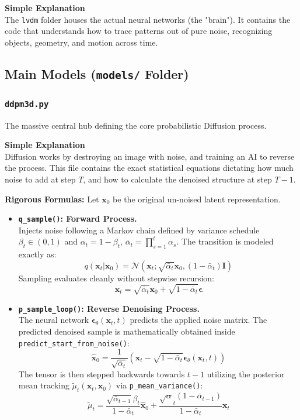 \documentclass[11pt,a4paper]{article}
\begin{document}
\begin{simplebox}
\textbf{Simple Explanation} \\
The \texttt{lvdm} folder houses the actual neural networks (the "brain"). It contains the code that understands how to trace patterns out of pure noise, recognizing objects, geometry, and motion across time.
\end{simplebox}

\subsection{Main Models (\texttt{models/} Folder)}

\subsubsection{\texttt{ddpm3d.py}}
The massive central hub defining the core probabilistic Diffusion process.
\begin{simplebox}
\textbf{Simple Explanation} \\
Diffusion works by destroying an image with noise, and training an AI to reverse the process. This file contains the exact statistical equations dictating how much noise to add at step $T$, and how to calculate the denoised structure at step $T-1$.
\end{simplebox}

\textbf{Rigorous Formulas:}
Let $\mathbf{x}_0$ be the original un-noised latent representation.
\begin{itemize}
    \item \textbf{\texttt{q\_sample()}: Forward Process.} \\
    Injects noise following a Markov chain defined by variance schedule $\beta_t \in (0, 1)$ and $\alpha_t = 1 - \beta_t$, $\bar{\alpha}_t = \prod_{s=1}^t \alpha_s$.
    The transition is modeled exactly as:
    \[ q(\mathbf{x}_t | \mathbf{x}_0) = \mathcal{N}(\mathbf{x}_t; \sqrt{\bar{\alpha}_t} \mathbf{x}_0, (1 - \bar{\alpha}_t)\mathbf{I}) \]
    Sampling evaluates cleanly without stepwise recursion:
    \[ \mathbf{x}_t = \sqrt{\bar{\alpha}_t}\mathbf{x}_0 + \sqrt{1 - \bar{\alpha}_t}\mathbf{\epsilon} \]
    
    \item \textbf{\texttt{p\_sample\_loop()}: Reverse Denoising Process.} \\
    The neural network $\mathbf{\epsilon}_\theta(\mathbf{x}_t, t)$ predicts the applied noise matrix. The predicted denoised sample is mathematically obtained inside \texttt{predict\_start\_from\_noise()}:
    \[ \hat{\mathbf{x}}_0 = \frac{1}{\sqrt{\bar{\alpha}_t}} \left( \mathbf{x}_t - \sqrt{1 - \bar{\alpha}_t} \mathbf{\epsilon}_\theta(\mathbf{x}_t, t) \right) \]
    The tensor is then stepped backwards towards $t-1$ utilizing the posterior mean tracking $\tilde{\mu}_t(\mathbf{x}_t, \mathbf{x}_0)$ via \texttt{p\_mean\_variance()}:
    \[ \tilde{\mu}_t = \frac{\sqrt{\bar{\alpha}_{t-1}}\beta_t}{1 - \bar{\alpha}_t} \hat{\mathbf{x}}_0 + \frac{\sqrt{\alpha}_t(1 - \bar{\alpha}_{t-1})}{1 - \bar{\alpha}_t} \mathbf{x}_t \]
\end{itemize}
\end{document}
